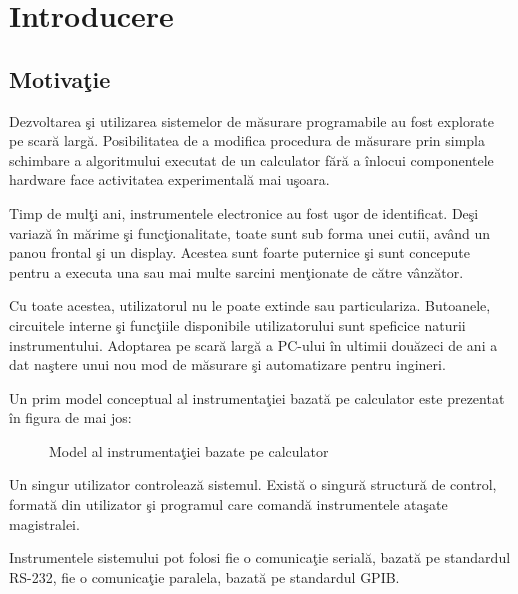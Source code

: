 
\chapter{Introducere} %
\label{Capitolul1}

\section{Motiva\c{t}ie}

Dezvoltarea \c{s}i utilizarea sistemelor de m\u{a}surare programabile au fost explorate pe scar\u{a} larg\u{a}. Posibilitatea de a modifica procedura de m\u{a}surare prin simpla schimbare a algoritmului executat de un calculator f\u{a}r\u{a} a \^{i}nlocui componentele hardware face activitatea experimental\u{a} mai u\c{s}oara.

Timp de mul\c{t}i ani, instrumentele electronice au fost u\c{s}or de identificat. De\c{s}i variaz\u{a} \^{i}n m\u{a}rime \c{s}i func\c{t}ionalitate, toate sunt sub forma unei cutii, av\^{a}nd un panou frontal \c{s}i un display. Acestea sunt foarte puternice \c{s}i sunt concepute pentru a executa una sau mai multe sarcini men\c{t}ionate de c\u{a}tre v\^{a}nz\u{a}tor.

Cu toate acestea, utilizatorul nu le poate extinde sau particulariza. Butoanele, circuitele interne \c{s}i func\c{t}iile disponibile utilizatorului sunt speficice naturii instrumentului. Adoptarea pe scar\u{a} larg\u{a} a PC-ului \^{i}n ultimii dou\u{a}zeci de ani a dat na\c{s}tere unui nou mod de m\u{a}surare \c{s}i automatizare pentru ingineri.

Un prim model conceptual al instrumenta\c{t}iei bazat\u{a} pe calculator este prezentat \^{i}n figura de mai jos:

\begin{figure}[tbp]
  \centering
  \caption{Model al instrumenta\c{t}iei bazate pe calculator}
  \label{figsistem}
\end{figure}

Un singur utilizator controleaz\u{a} sistemul. Exist\u{a} o singur\u{a} structur\u{a} de control, format\u{a} din utilizator \c{s}i programul care comand\u{a} instrumentele ata\c{s}ate magistralei.

Instrumentele sistemului pot folosi fie o comunica\c{t}ie serial\u{a}, bazat\u{a} pe standardul RS-232, fie o comunica\c{t}ie paralela, bazat\u{a} pe standardul GPIB.

